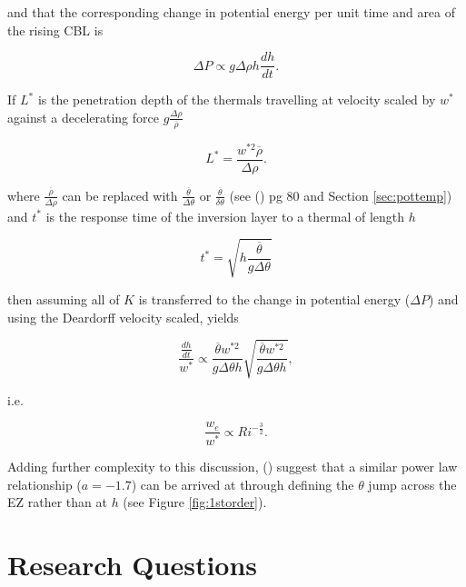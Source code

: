 and that the corresponding change in potential energy per unit time and area of the rising \acs{CBL} is

\begin{equation}
\Delta P \propto g \Delta \rho h \frac{d h}{ dt}.  
\end{equation}

If $L^{*}$ is the penetration depth of the thermals travelling at velocity scaled by $w^{*}$ against a decelerating force
$g \frac{\Delta \rho}{\overline{\rho}}$

\begin{equation}
L^{*} = \frac{w^{*2} \overline{\rho}}{\Delta \rho}.  
\end{equation}

where $\frac{\overline{\rho}}{\Delta \rho}$ can be replaced with $\frac{\overline{\theta}}{\Delta \theta}$ or $\frac{\overline{\theta}}{\delta \theta}$ (see \citeauthor{Stull-BLMetIntro} (\citeyear{Stull-BLMetIntro}) pg 80 and Section \ref{sec:pottemp}) and $t^{*}$ is the response time of the inversion layer to a thermal of length $h$

\begin{equation}
t^{*} = \sqrt{h \frac{\overline{\theta}}{g \Delta \theta}}  
\end{equation}

then assuming all of $K$ is transferred to the change in potential energy ($\Delta P$) and using the Deardorff velocity scaled, yields

\begin{equation}
\frac{\frac{dh}{dt}}{w^{*}} \propto \frac{\overline{\theta} w^{*2}}{g \Delta \theta h} \sqrt{\frac{\overline{\theta} w^{*2}}{g \Delta \theta h}},
\end{equation}

i.e.

\begin{equation}
\frac{w_{e}}{w^{*}} \propto Ri^{-\frac{3}{2}}.
\end{equation}

Adding further complexity to this discussion, \citeauthor{FedConzMir04} (\citeyear{FedConzMir04}) suggest that a similar power law relationship ($a = -1.7$) can be arrived at through defining the $\theta$ jump across the \acs{EZ} rather than at $h$ (see Figure \ref{fig:1storder}).\\


\section{Research Questions}
\label{sec:resquest}

